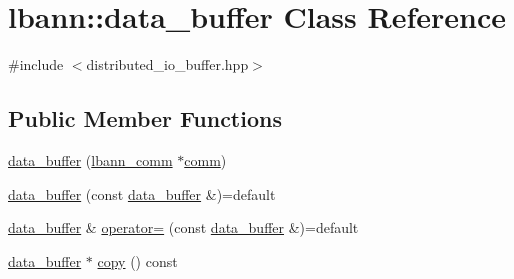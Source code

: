 \hypertarget{classlbann_1_1data__buffer}{}\section{lbann\+:\+:data\+\_\+buffer Class Reference}
\label{classlbann_1_1data__buffer}


{\ttfamily \#include $<$distributed\+\_\+io\+\_\+buffer.\+hpp$>$}

\subsection*{Public Member Functions}
\begin{DoxyCompactItemize}
\item 
\hyperlink{classlbann_1_1data__buffer_ad03198df8b35ac6349180d5b2bc036d5}{data\+\_\+buffer} (\hyperlink{classlbann_1_1lbann__comm}{lbann\+\_\+comm} $\ast$\hyperlink{file__io_8cpp_ab048c6f9fcbcfaa57ce68b00263dbebe}{comm})
\item 
\hyperlink{classlbann_1_1data__buffer_afdb150ed440864137d491685155a1d75}{data\+\_\+buffer} (const \hyperlink{classlbann_1_1data__buffer}{data\+\_\+buffer} \&)=default
\item 
\hyperlink{classlbann_1_1data__buffer}{data\+\_\+buffer} \& \hyperlink{classlbann_1_1data__buffer_a364283f9ce3d811ec73fc3c2513f11a6}{operator=} (const \hyperlink{classlbann_1_1data__buffer}{data\+\_\+buffer} \&)=default
\item 
\hyperlink{classlbann_1_1data__buffer}{data\+\_\+buffer} $\ast$ \hyperlink{classlbann_1_1data__buffer_acd96a02a4709efe967f34cd004d742b5}{copy} () const
\end{DoxyCompactItemize}

